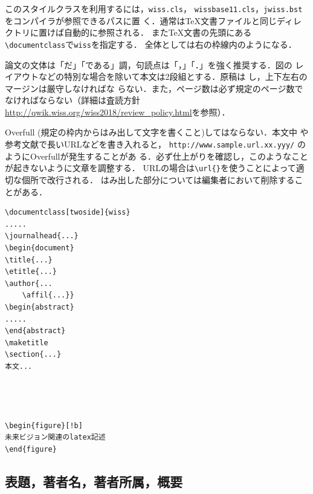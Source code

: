 \documentclass[twoside]{wiss}
\begin{document}
このスタイルクラスを利用するには，\verb|wiss.cls|，
\verb|wissbase11.cls|，\verb|jwiss.bst|をコンパイラが参照できるパスに置
く．通常は\TeX 文書ファイルと同じディレクトリに置けば自動的に参照される．
また\TeX 文書の先頭にある\verb|\documentclass|で\verb|wiss|を指定する．
全体としては右の枠線内のようになる．

論文の文体は「だ」「である」調，句読点は「，」「．」を強く推奨する．図の
レイアウトなどの特別な場合を除いて本文は2段組とする．原稿は
し，上下左右のマージンは厳守しなければな
らない．また，ページ数は必ず規定のページ数でなければならない（詳細は査読方針 \url{http://qwik.wiss.org/wiss2018/review_policy.html}を参照）．

Overfull (規定の枠内からはみ出して文字を書くこと)してはならない．本文中
や参考文献で長いURLなどを書き入れると，
\verb|http://www.sample.url.xx.yyy/| のようにOverfullが発生することがあ
る．必ず仕上がりを確認し，このようなことが起きないように文章を調整する．
URLの場合は\verb|\url{}|を使うことによって適切な個所で改行される．
はみ出した部分については編集者において削除することがある．

\begin{screen}
\begin{verbatim}
\documentclass[twoside]{wiss}
.....
\journalhead{...}
\begin{document}
\title{...}
\etitle{...}
\author{...
    \affil{...}}
\begin{abstract}
.....
\end{abstract}
\maketitle
\section{...}
本文...




\begin{figure}[!b]
未来ビジョン関連のlatex記述
\end{figure}
\end{verbatim}
\end{screen}



\subsection{表題，著者名，著者所属，概要}
\end{document}
